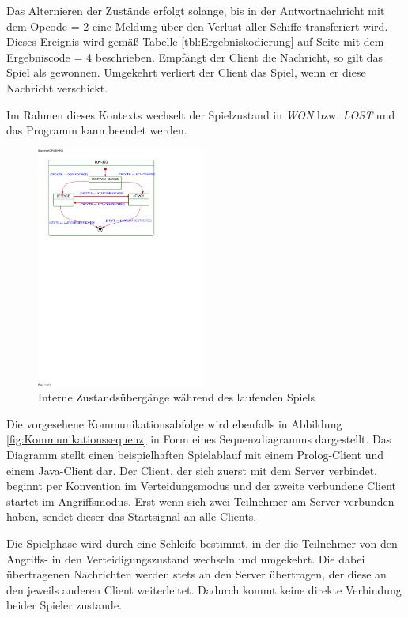 Das Alternieren der Zustände erfolgt solange, bis in der Antwortnachricht mit dem Opcode = 2 eine Meldung über den Verlust aller Schiffe transferiert wird.
Dieses Ereignis wird gemäß Tabelle \ref{tbl:Ergebniskodierung} auf Seite \pageref{tbl:Ergebniskodierung} mit dem Ergebniscode = 4 beschrieben.
Empfängt der Client die Nachricht, so gilt das Spiel als gewonnen.
Umgekehrt verliert der Client das Spiel, wenn er diese Nachricht verschickt.

Im Rahmen dieses Kontexts wechselt der Spielzustand in \emph{WON} bzw. \emph{LOST} und das Programm kann beendet werden.

\begin{figure}[H]
  \centering
  \includegraphics[trim=10mm 185mm 60mm 10mm,clip,width=0.5\textwidth]{images/SubSMRUNNING.pdf}
  \caption{Interne Zustandsübergänge während des laufenden Spiels}
  \label{fig:SubClientstates}
\end{figure}

Die vorgesehene Kommunikationsabfolge wird ebenfalls in Abbildung \ref{fig:Kommunikationssequenz} in Form eines Sequenzdiagramms dargestellt.
Das Diagramm stellt einen beispielhaften Spielablauf mit einem Prolog-Client und einem Java-Client dar. 
Der Client, der sich zuerst mit dem Server verbindet, beginnt per Konvention im Verteidungsmodus und der zweite verbundene Client startet im Angriffsmodus.
Erst wenn sich zwei Teilnehmer am Server verbunden haben, sendet dieser das Startsignal an alle Clients.

Die Spielphase wird durch eine Schleife bestimmt, in der die Teilnehmer von den Angriffs- in den Verteidigungszustand wechseln und umgekehrt.
Die dabei übertragenen Nachrichten werden stets an den Server übertragen, der diese an den jeweils anderen Client weiterleitet.
Dadurch kommt keine direkte Verbindung beider Spieler zustande.

